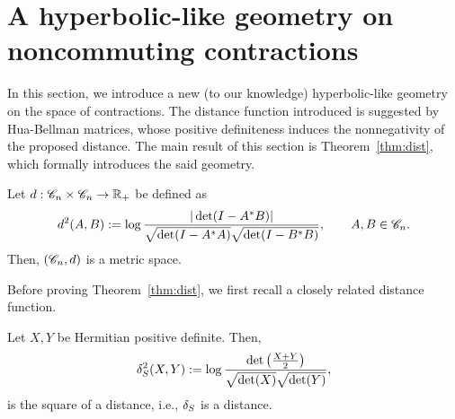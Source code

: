 \documentclass[11pt]{article}
\begin{document}


\section{A hyperbolic-like geometry on noncommuting contractions}
\label{sec:metric}
In this section, we introduce a new (to our knowledge) hyperbolic-like geometry on the space of contractions. The  distance function introduced is suggested by Hua-Bellman matrices, whose positive definiteness induces the nonnegativity of the proposed distance. The main result of this section is Theorem~\ref{thm:dist}, which formally introduces the said geometry.
\begin{theorem}
  \label{thm:dist}
  Let $d: \mathscr{C}_n \times \mathscr{C}_n \to \mathbb{R}_+$ be defined as
  \begin{equation}
    \label{eq:dist}
    d^2(A, B) := 
    \log \frac{|\det(I-A^*B)|}{\sqrt{\det(I-A^*A)}\sqrt{\det(I-B^*B)}},\qquad A, B \in \mathscr{C}_n.
  \end{equation}
  Then, $(\mathscr{C}_n,d)$ is a metric space.
\end{theorem}

Before proving Theorem~\ref{thm:dist}, we first recall a closely related distance function.
\begin{theorem}
  \label{thm:sdiv}
  Let $X, Y$ be Hermitian positive definite. Then,
  \begin{equation}
    \label{eq:17}
    \delta_S^2(X,Y) := \log\frac{\det\left(\tfrac{X+Y}{2}\right)}{\sqrt{\det(X)}\sqrt{\det(Y)}},
  \end{equation}
  is the square of a distance, i.e., $\delta_S$ is a distance.
\end{theorem}
\end{document}
